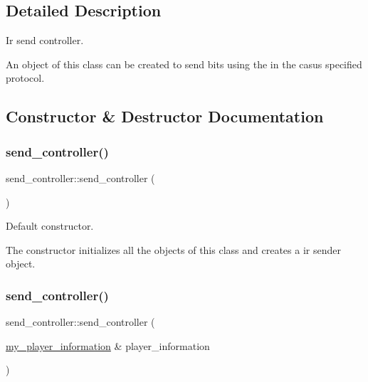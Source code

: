 \subsection{Detailed Description}
Ir send controller. 

An object of this class can be created to send bits using the in the casus specified protocol. 

\subsection{Constructor \& Destructor Documentation}
\hypertarget{classsend__controller_a31abdb529dba4bde0893bf04d0ef113d}{}\label{classsend__controller_a31abdb529dba4bde0893bf04d0ef113d} 
\subsubsection{\texorpdfstring{send\+\_\+controller()}{send\_controller()}\hspace{0.1cm}{\footnotesize\ttfamily [1/2]}}
{\footnotesize\ttfamily send\+\_\+controller\+::send\+\_\+controller (\begin{DoxyParamCaption}{ }\end{DoxyParamCaption})\hspace{0.3cm}{\ttfamily [inline]}}



Default constructor. 

The constructor initializes all the objects of this class and creates a ir sender object. \hypertarget{classsend__controller_a4f7f3b8afe7b94c3b6f284ad31fb4492}{}\label{classsend__controller_a4f7f3b8afe7b94c3b6f284ad31fb4492} 
\subsubsection{\texorpdfstring{send\+\_\+controller()}{send\_controller()}\hspace{0.1cm}{\footnotesize\ttfamily [2/2]}}
{\footnotesize\ttfamily send\+\_\+controller\+::send\+\_\+controller (\begin{DoxyParamCaption}\item[{\hyperlink{classmy__player__information}{my\+\_\+player\+\_\+information} \&}]{player\+\_\+information }\end{DoxyParamCaption})\hspace{0.3cm}{\ttfamily [inline]}}



